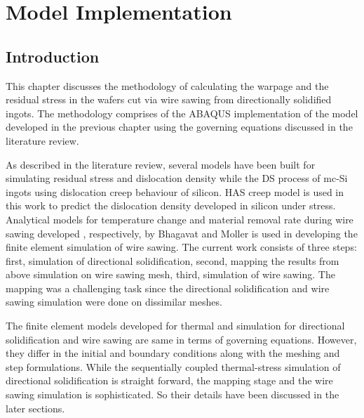 \chapter{Model Implementation}
\section{Introduction}

This chapter discusses the methodology of calculating the warpage and the residual stress in the wafers cut via wire sawing from directionally solidified ingots. The methodology comprises of the ABAQUS implementation of the model developed in the previous chapter using the governing equations discussed in the literature review. 



As described in the literature review, several models have been built for simulating residual stress and dislocation density while the DS process of mc-Si ingots using dislocation creep behaviour of silicon. HAS creep model is used in this work to predict the dislocation density developed in silicon under stress. Analytical models for temperature change and material removal rate during wire sawing developed , respectively, by Bhagavat and Moller is used in developing the finite element simulation of wire sawing. The current work consists of three steps: first, simulation of directional solidification, second, mapping the results from above simulation on wire sawing mesh, third, simulation of wire sawing. The mapping was a challenging task since the directional solidification and wire sawing simulation were done on dissimilar meshes. 

The finite element models developed for thermal and simulation for directional solidification and wire sawing are same in terms of governing equations. However, they differ in the initial and boundary conditions along with the meshing and step formulations. While the sequentially coupled thermal-stress simulation of directional solidification is straight forward, the mapping stage and the wire sawing simulation is sophisticated. So their details have been discussed in the later sections.

